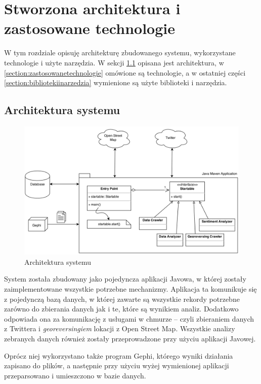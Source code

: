 \chapter{Stworzona architektura i zastosowane technologie}
\label{chapter:architektura}
W tym rozdziale opisuję architekturę zbudowanego systemu, wykorzystane
technologie i użyte narzędzia.
W sekcji \ref{section:architekturasystemu} opisana jest architektura, w
\ref{section:zastosowanetechnologie} omówione są technologie, a w ostatniej
części \ref{section:bibliotekiinarzedzia} wymienione są użyte biblioteki i
narzędzia.
\section{Architektura systemu}
\label{section:architekturasystemu}

\begin{figure}[ht!]
\centering
\includegraphics[width=160mm]{img/architektura.png}
\caption{Architektura systemu}
\label{image:architektura-systemu}
\end{figure}
System została zbudowany jako pojedyncza aplikacji Javowa,
w której zostały zaimplementowane wszystkie potrzebne mechanizmy.
Aplikacja ta komunikuje się z pojedynczą bazą danych, w której zawarte
są wszystkie rekordy potrzebne zarówno do zbierania danych jak i te, które są
wynikiem analiz. Dodatkowo odpowiada ona za komunikację z usługami w chmurze --
czyli zbieraniem danych z Twittera i \textit{georeversingiem} lokacji z Open
Street Map. Wszystkie analizy zebranych danych również zostały przeprowadzone
przy użyciu aplikacji Javowej.

Oprócz niej wykorzystano także program Gephi, którego wyniki działania zapisano
do plików, a następnie przy użyciu wyżej wymienionej aplikacji przeparsowano i
umieszczono w bazie danych.


